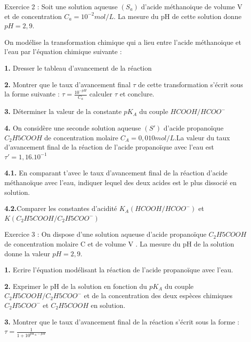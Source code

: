 \documentclass[12pt, french]{article}
\begin{document}
\begin{Box2}{Exercice 2 :}
Soit une solution aqueuse $(S_a)$ d’acide méthanoique de volume V et de concentration $C_a = 10^{-2}mol/L$. La mesure du pH de cette solution donne $pH=2,9$.

On modélise la transformation chimique qui a lieu entre
l’acide méthanoique et l’eau par l’équation chimique
suivante :


\textbf{1. }Dresser le tableau d’avancement de la réaction

\textbf{2. }Montrer que le taux d’avancement final $\tau$ de cette transformation s’écrit sous la forme suivante : $\tau = \frac{10^{-pH}}{C_a}$ calculer $\tau$ et conclure.

\textbf{3. }Déterminer la valeur de la constante $pK_A$ du couple $HCOOH/HCOO^-$

\textbf{4. }On considère une seconde solution aqueuse $(S')$ d'acide propanoïque $C_2H5COOH$ de concentration molaire $C_A =0,010mol/L$.La valeur du taux d'avancement final de la réaction de l'acide propanoïque avec l'eau est $\tau' = 1,16.10^{-1}$

\textbf{4.1. }En comparant t'avec le taux d'avancement final de la
réaction d'acide méthanoïque avec l'eau, indiquer lequel
des deux acides est le plus dissocié en solution.

\textbf{4.2.}Comparer les constantes d'acidité $K_A(HCOOH/HCOO^-)$ et $K(C_2H5COOH/C_2H5COO^-)$ 

\end{Box2}

\begin{Box2}{Exercice 3 : }
On dispose d’une solution aqueuse d’acide propanoïque $C_2H5COOH$ de concentration molaire C et de volume V . La mesure du pH de la solution donne la valeur $pH  = 2,9$.

\textbf{1. }Ecrire l’équation modélisant la réaction de l’acide propanoïque avec l’eau.

\textbf{2. }Exprimer le pH de la solution en fonction du $pK_A$ du couple $C_2H5COOH/C_2H5COO^-$ et de la concentration des deux espèces chimiques $C_2H5COO^- $ et $C_2H5COOH$ en solution.

\textbf{3. }Montrer que le taux d’avancement final de la réaction
s’écrit sous la forme : $\tau =  \frac{1}{1 + 10^{pK_A - pH}}$ 
\end{Box2}
\end{document}
